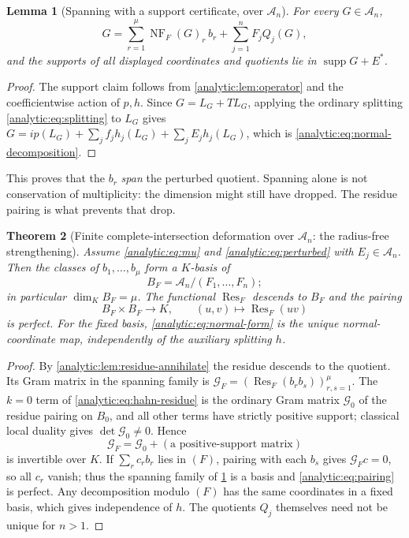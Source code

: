\documentclass[11pt,letterpaper]{article}
\newtheorem{theorem}{Theorem}[section]
\newtheorem{lemma}[theorem]{Lemma}
\theoremstyle{definition}
\theoremstyle{remark}
\newcommand{\A}{\mathscr A}
\newcommand{\Res}{\operatorname{Res}}
\newcommand{\supp}{\operatorname{supp}}
\newcommand{\NF}{\operatorname{NF}}
\numberwithin{equation}{section}
\begin{document}
\begin{lemma}[Spanning with a support certificate, over $\A_n$]
\label{analytic:lem:spanning}
For every $G\in\A_n$,
\begin{equation}\label{analytic:eq:normal-decomposition}
 G=\sum_{r=1}^\mu\NF_F(G)_r\,b_r+\sum_{j=1}^nF_jQ_j(G),
\end{equation}
and the supports of all displayed coordinates and quotients lie in
$\supp G+E^*$.
\end{lemma}
\begin{proof}
The support claim follows from \cref{analytic:lem:operator} and the
coefficientwise action of $p,h$. Since $G=L_G+TL_G$, applying the ordinary
splitting \eqref{analytic:eq:splitting} to $L_G$ gives
$G=ip(L_G)+\sum_jf_jh_j(L_G)+\sum_jE_jh_j(L_G)$, which is
\eqref{analytic:eq:normal-decomposition}.
\end{proof}

This proves that the $b_r$ \emph{span} the perturbed quotient. Spanning
alone is not conservation of multiplicity: the dimension might still have
dropped. The residue pairing is what prevents that drop.

\begin{theorem}[Finite complete-intersection deformation over $\A_n$:
the radius-free strengthening]\label{analytic:thm:finite-deformA}
Assume \eqref{analytic:eq:mu} and \eqref{analytic:eq:perturbed} with
$E_j\in\A_n$. Then the classes of $b_1,\ldots,b_\mu$ form a $K$-basis of
\[
 B_F=\A_n/(F_1,\ldots,F_n);
\]
in particular $\dim_KB_F=\mu$. The functional $\Res_F$ descends to $B_F$ and
the pairing
\begin{equation}\label{analytic:eq:pairing}
 B_F\times B_F\longrightarrow K,\qquad (u,v)\longmapsto\Res_F(uv)
\end{equation}
is perfect. For the fixed basis, \eqref{analytic:eq:normal-form} is the
unique normal-coordinate map, independently of the auxiliary splitting $h$.
\end{theorem}
\begin{proof}
By \cref{analytic:lem:residue-annihilate} the residue descends to the
quotient. Its Gram matrix in the spanning family is
$\mathcal G_F=(\Res_F(b_rb_s))_{r,s=1}^\mu$. The $k=0$ term of
\eqref{analytic:eq:hahn-residue} is the ordinary Gram matrix
$\mathcal G_0$ of the residue pairing on $B_0$, and all other terms have
strictly positive support; classical local duality gives
$\det\mathcal G_0\ne0$. Hence
\[
 \mathcal G_F=\mathcal G_0+(\text{a positive-support matrix})
\]
is invertible over $K$. If $\sum_rc_rb_r$ lies in $(F)$, pairing with each
$b_s$ gives $\mathcal G_Fc=0$, so all $c_r$ vanish; thus the spanning family
of \cref{analytic:lem:spanning} is a basis and
\eqref{analytic:eq:pairing} is perfect. Any decomposition modulo $(F)$ has
the same coordinates in a fixed basis, which gives independence of $h$. The
quotients $Q_j$ themselves need not be unique for $n>1$.
\end{proof}
\end{document}
